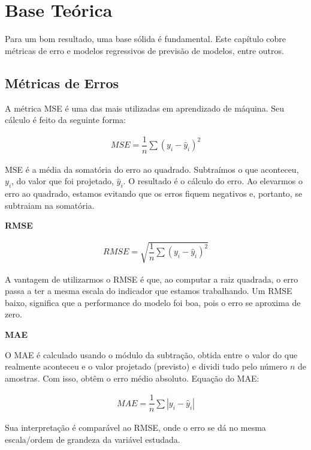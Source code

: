 \section{Base Te\'orica}\label{sec:base}

Para um bom resultado, uma base sólida é fundamental. Este capítulo cobre métricas de erro e modelos regressivos de previsão de modelos, entre outros.

\subsection{M\'etricas de Erros}\label{subsec:metrica}


A métrica MSE é uma das mais utilizadas em aprendizado de máquina. Seu cálculo é feito da seguinte forma:

\begin{eqnarray}
	M S E=\dfrac{1}{n} \sum\left(y_i-\hat{y}_i\right)^2\label{eq:mse}
\end{eqnarray}

MSE é a média da somatória do erro ao quadrado. Subtraímos o que aconteceu, $y_i$, do valor que foi projetado, $\hat{y}_i$. O resultado é o cálculo do erro. Ao elevarmos o erro ao quadrado, estamos evitando que os erros fiquem negativos e, portanto, se subtraiam na somatória.

\textbf{RMSE}

\begin{eqnarray}
	R M S E=\sqrt{\dfrac{1}{n} \sum\left(y_i-\hat{y}_i\right)^2}\label{eq:rmse}
\end{eqnarray}

A vantagem de utilizarmos o RMSE é que, ao computar a raiz quadrada, o erro passa a ter a mesma escala do indicador que estamos trabalhando. Um RMSE baixo, significa que a performance do modelo foi boa, pois o erro se aproxima de zero.

\textbf{MAE}

O MAE é calculado usando o módulo da subtração, obtida entre o valor do que realmente aconteceu e o valor projetado (previsto) e dividi tudo pelo número $n$ de amostras. Com isso, obtêm o erro médio absoluto. Equação do MAE:

\begin{eqnarray}
	M A E=\dfrac{1}{n} \sum\left|y_i-\hat{y}_i\right|\label{eq:mae}
\end{eqnarray}

Sua interpretação é comparável ao RMSE, onde o erro se dá no mesma escala/ordem de grandeza da variável estudada.

